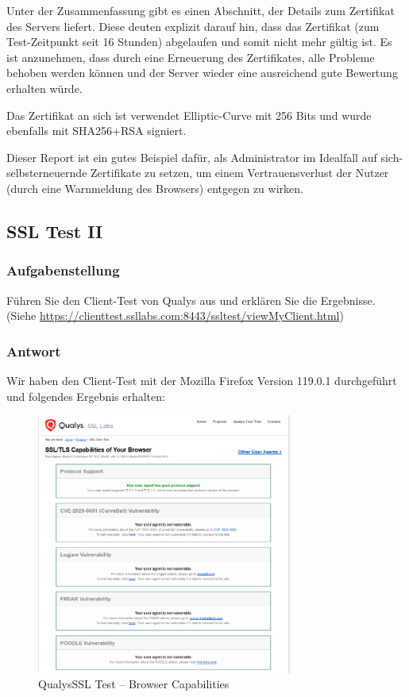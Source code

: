 \documentclass{article}
\begin{document}
Unter der Zusammenfassung gibt es einen Abschnitt, der Details zum Zertifikat des Servers liefert. Diese deuten
explizit darauf hin, dass das Zertifikat (zum Test-Zeitpunkt seit 16 Stunden) abgelaufen und somit nicht mehr gültig ist.
Es ist anzunehmen, dass durch eine Erneuerung des Zertifikates, alle Probleme behoben werden können und der Server wieder
eine ausreichend gute Bewertung erhalten würde.

Das Zertifikat an sich ist verwendet Elliptic-Curve mit 256 Bits und wurde ebenfalls mit SHA256+RSA signiert.

Dieser Report ist ein gutes Beispiel dafür, als Administrator im Idealfall auf sich-selbsterneuernde Zertifikate zu setzen,
um einem Vertrauensverlust der Nutzer (durch eine Warnmeldung des Browsers) entgegen zu wirken.

\newpage

\subsection{SSL Test II}

\subsubsection*{Aufgabenstellung}

Führen Sie den Client-Test von Qualys aus und erklären Sie die Ergebnisse. (Siehe \url{https://clienttest.ssllabs.com:8443/ssltest/viewMyClient.html})

\subsubsection*{Antwort}

Wir haben den Client-Test mit der Mozilla Firefox Version 119.0.1 durchgeführt und folgendes Ergebnis erhalten:

\begin{figure}[H]
	\includegraphics[width=0.75\textwidth]{images/03}
	\centering
	\caption{QualysSSL Test – Browser Capabilities}
\end{figure}
\end{document}

